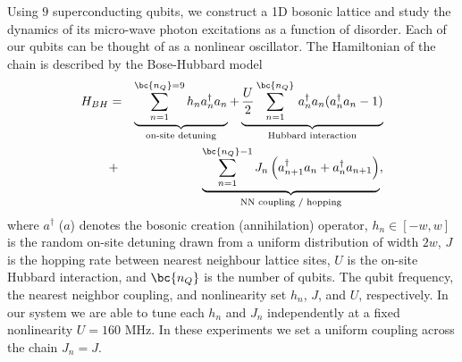 


Using $9$  superconducting qubits, we construct a 1D bosonic lattice and study the dynamics of its micro-wave photon excitations as a function of disorder.
Each of our qubits can be thought of as a nonlinear oscillator. The Hamiltonian of the chain is described by the Bose-Hubbard model
\vspace{-8pt}
\begin{eqnarray}
    H_{BH} &=& \underbrace{\sum\limits_{n=1}^{\bc{n_Q} = 9} h_n a^{\dagger}_{n}a_{n}}_{\text{on-site detuning}} +
    \underbrace{\frac{U}{2}\sum\limits_{n=1}^{\bc{n_Q}} \,a^{\dagger}_{n}a_n(a^{\dagger}_{n}a_n-1)}_{\text{Hubbard interaction}} \nonumber \\
    &+& \underbrace{\sum_{n=1}^{\bc{n_Q}-1}J_n \left( a^{\dagger}_{n+1}a_n+a^{\dagger}_{n}a_{n+1} \right) }_{\text{NN coupling / hopping}},
\end{eqnarray}
\noindent
where $a^{\dagger}$ ($a$) denotes the bosonic creation (annihilation) operator, $h_n\in \left[ -w, w \right]$ is the random on-site detuning drawn from a uniform distribution of width $2w$,
$J$ is the hopping rate between nearest neighbour lattice sites, $U$ is the on-site Hubbard interaction, and $\bc{n_Q}$ is the number of qubits.
The qubit frequency, the nearest neighbor coupling, and nonlinearity set $h_n$, $J$, and $U$, respectively.
In our system we are able to tune each $h_n$ and $J_n$ independently at a fixed nonlinearity $U=160$ MHz.
In these experiments we set a uniform coupling across the chain $J_n = J$.

